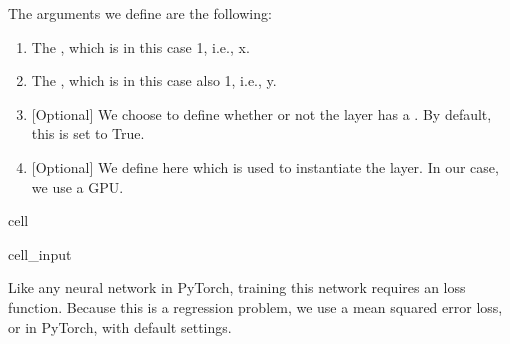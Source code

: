 \documentclass[letterpaper,10pt,english]{jupyterBook}
\begin{document}
\sphinxAtStartPar
The arguments we define are the following:
\begin{enumerate}
%
\item {} 
\sphinxAtStartPar
The , which is in this case 1, i.e., x.

\item {} 
\sphinxAtStartPar
The , which is in this case also 1, i.e., y.

\item {} 
\sphinxAtStartPar
{[}Optional{]} We choose to define whether or not the layer has a . By default, this is set to True.

\item {} 
\sphinxAtStartPar
{[}Optional{]} We define here which  is used to instantiate the layer. In our case, we use a GPU.

\end{enumerate}

\begin{sphinxuseclass}{cell}\begin{sphinxVerbatimInput}

\begin{sphinxuseclass}{cell_input}
\begin{sphinxVerbatim}[commandchars=\\\{\}]
     
\end{sphinxVerbatim}

\end{sphinxuseclass}\end{sphinxVerbatimInput}

\end{sphinxuseclass}
\sphinxAtStartPar
Like any neural network in PyTorch, training this network requires an loss function. Because this is a regression problem, we use a mean squared error loss, or  in PyTorch, with default settings.
\end{document}

